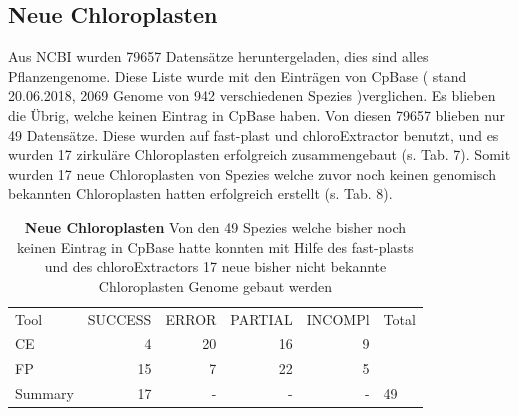 \documentclass{scrartcl}
\begin{document}
\subsection{Neue Chloroplasten}
\label{sec-4-10}
Aus NCBI wurden 79657 Datensätze heruntergeladen, dies sind alles Pflanzengenome. Diese Liste wurde mit den Einträgen von CpBase ( stand 20.06.2018, 2069 Genome von 942 verschiedenen Spezies )verglichen. Es blieben die Übrig, welche keinen Eintrag in CpBase haben. 
Von diesen 79657 blieben nur 49 Datensätze. Diese wurden auf fast-plast und chloroExtractor benutzt, und es wurden 17 zirkuläre Chloroplasten erfolgreich zusammengebaut (s. Tab. 7). Somit wurden 17 neue Chloroplasten von Spezies
welche zuvor noch keinen genomisch bekannten Chloroplasten hatten erfolgreich erstellt (s. Tab. 8).
\begin{table}[!h]
\caption[Neue Chloroplasten]{\textbf{Neue Chloroplasten} Von den 49 Spezies welche bisher noch keinen Eintrag in CpBase hatte konnten mit Hilfe des fast-plasts und des chloroExtractors 17 neue bisher nicht bekannte Chloroplasten Genome gebaut werden}
\begin{center}
\begin{tabular}{lrrrrl}
Tool & SUCCESS & ERROR & PARTIAL & INCOMPl & Total\\
CE & 4 & 20 & 16 & 9 & \\
FP & 15 & 7 & 22 & 5 & \\
Summary & 17 & - & - & - & 49\\
\end{tabular}
\end{center}
\end{table}
\end{document}
